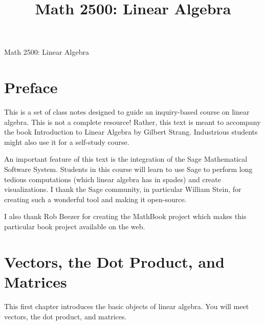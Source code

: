 \documentclass[10pt,]{book}
\title{Math 2500: Linear Algebra}
\author{}
\date{}
\theoremstyle{plain}
\numberwithin{equation}{section}
\begin{document}
\frontmatter
\thispagestyle{empty}
\begin{center}
{\Huge Math 2500: Linear Algebra}
\end{center}\par
{}
\clearpage
\thispagestyle{empty}
\clearpage
\maketitle
\clearpage
\thispagestyle{empty}
\clearpage
\setcounter{tocdepth}{1}
\renewcommand*\contentsname{Contents}
\tableofcontents
\chapter{Preface}
This is a set of class notes designed to guide an inquiry-based course
      on linear algebra. This is not a complete resource! Rather, this text is
      meant to accompany the book Introduction to Linear Algebra by
      Gilbert Strang. Industrious students might also use it for a self-study
      course.
\par
An important feature of this text is the integration of the Sage
      Mathematical Software System. Students in this course will learn to use
      Sage to perform long tedious computations (which linear algebra has in
      spades) and create visualizations.
I thank the Sage community, in particular William Stein, for creating
      such a wonderful tool and making it open-source.
\par
I also thank Rob Beezer for creating the MathBook project which makes
      this particular book project available on the web.
\mainmatter
\typeout{************************************************}
\typeout{************************************************}
\chapter[Vectors, the Dot Product, and Matrices]{Vectors, the Dot Product, and Matrices}\label{chapter-basic-objects}

      This first chapter introduces the basic objects of linear algebra.
      You will meet vectors, the dot product, and matrices.
\par
\end{document}
